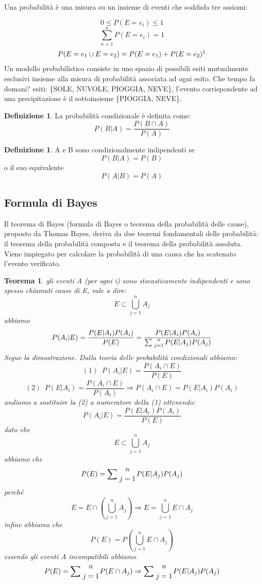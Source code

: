 \documentclass{article}
\theoremstyle{plain}
\newtheorem{thm}{Teorema}[]
\theoremstyle{definition}
\newtheorem{defn}[]{Definizione} %
\begin{document}

Una probabilità è una misura su un insieme di eventi che soddisfa tre assiomi:

$$0≤P(E=e_i)≤1$$
$$\sum_{n=1}^{n} P(E=e_i)=1$$
$$P(E=e_1\cup E=e_2)=P(E=e_1)+P(E=e_2)\footnotemark$$
Un modello probabilistico consiste in uno spazio di possibili esiti mutualmente esclusivi insieme alla misura di probabilità associata ad ogni esito.
Che tempo fa domani? esiti: \{SOLE, NUVOLE, PIOGGIA, NEVE\}, l'evento corrispondente ad una precipitazione è il sottoinsieme \{PIOGGIA, NEVE\}.
\begin{defn}
	La probabilità condizionale è definita come: $$P(B|A)=\frac{P(B \cap A)}{P(A)}$$
\end{defn}
\begin{defn}
	A e B sono condizionalmente indipendenti se $$P(B|A)=P(B)$$ o il suo equivalente $$P(A|B)=P(A)$$
\end{defn}

\subsection{Formula di Bayes}
Il teorema di Bayes (formula di Bayes o teorema della probabilità delle cause), proposto da Thomas Bayes, deriva da due teoremi fondamentali delle probabilità: il teorema della probabilità composta e il teorema della probabilità assoluta. Viene impiegato per calcolare la probabilità di una causa che ha scatenato l'evento verificato.
\begin{thm}
gli eventi A (per ogni i) sono stocasticamente indipendenti e sono spesso chiamati cause di E, vale a dire:
$$E \subset \bigcup\limits_{j=1}^{n} A_j $$
abbiamo
$$P(A_{i}|E)={\frac  {P(E|A_{i})P(A_{i})}{P(E)}}={\frac  {P(E|A_{i})P(A_{i})}{\sum {n \atop j=1}P(E|A_{j})P(A_{j})}}$$
Segue la dimostrazione.\footnotemark
Dalla teoria delle probabilità condizionali abbiamo:
$$(1)\,\,\, P(A_i|E)=\frac{P(A_i\cap E)}{P(E)}$$
$$(2)\,\,\, P(E|A_i)=\frac{P(A_i\cap E)}{P(A_i)} \Rightarrow P(A_i\cap E)=P(E|A_i)P(A_i)$$
andiamo a sostituire la (2) a numeratore della (1) ottenendo: 
$$P(A_i|E)=\frac{P(E|A_i)P(A_i)}{P(E)}$$
dato che
$$E \subset \bigcup\limits_{j=1}^{n} A_j $$
abbiamo che
$$P(E)=\sum {n \atop j=1}P(E|A_{j})P(A_{j})$$
perché
$$E=E \cap (\bigcup\limits_{j=1}^{n} A_j) \Rightarrow E=\bigcup\limits_{j=1}^{n} E \cap A_j$$  
infine abbiamo che
$$P(E)=P(\bigcup\limits_{j=1}^{n} E \cap A_j)$$ 
essendo gli eventi A incompatibili abbiamo 
$$P(E)=\sum {n \atop j=1}P(E \cap A_{j}) \Rightarrow 
\sum {n \atop j=1}P(E|A_{j})P(A_{j})$$


\end{thm}
\end{document}

